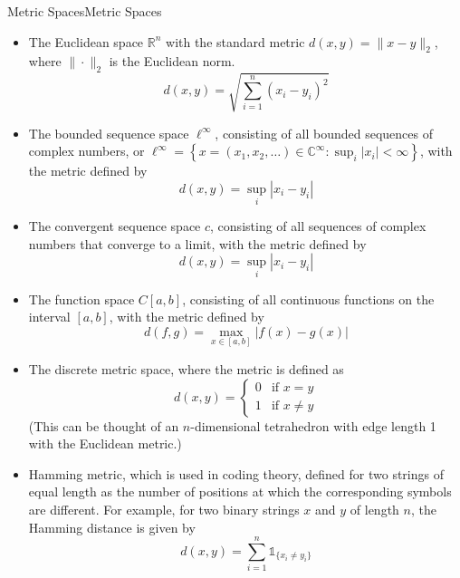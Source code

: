 \documentclass[../main.tex]{subfiles}
\begin{document}
\begin{example}{Metric Spaces}{Metric Spaces}
\begin{itemize}
	\item The Euclidean space $\mathbb{R}^n$ with the standard metric $d(x, y) = \|x - y\|_2$, where $\| \cdot \|_2$ is the Euclidean norm.
		\begin{equation*}
			d(x, y) = \sqrt{\sum_{i=1}^n (x_i - y_i)^2}
		\end{equation*}
	\item The bounded sequence space $\ell^{\infty }$, consisting of all bounded sequences of complex numbers, or $\ell^{\infty } = \left\{ x = (x_1, x_2, \ldots) \in \mathbb{C}^\infty : \sup_{i} |x_i| < \infty \right\}$, with the metric defined by
		\begin{equation*}
			d(x, y) = \sup_{i} |x_i - y_i|
		\end{equation*}
	\item The convergent sequence space $c$, consisting of all sequences of complex numbers that converge to a limit, with the metric defined by
		\begin{equation*}
			d(x, y) = \sup_{i} |x_i - y_i|
		\end{equation*}
	\item The function space $C[a,b]$, consisting of all continuous functions on the interval $[a, b]$, with the metric defined by
		\begin{equation*}
			d(f, g) = \max_{x \in [a, b]} |f(x) - g(x)|
		\end{equation*}
	\item The discrete metric space, where the metric is defined as
		\begin{equation*}
			d(x, y) = 
			\begin{cases} 
				0 & \text{if } x = y \\ 
				1 & \text{if } x \neq y 
			\end{cases}
		\end{equation*}
		(This can be thought of an $n$-dimensional tetrahedron with edge length 1 with the Euclidean metric.)
	\item Hamming metric, which is used in coding theory, defined for two strings of equal length as the number of positions at which the corresponding symbols are different. For example, for two binary strings $x$ and $y$ of length $n$, the Hamming distance is given by
		\begin{equation*}
			d(x, y) = \sum_{i=1}^n \mathbb{1}_{\{x_i \neq y_i\}}
		\end{equation*}

\end{itemize}
\end{example}
\end{document}
